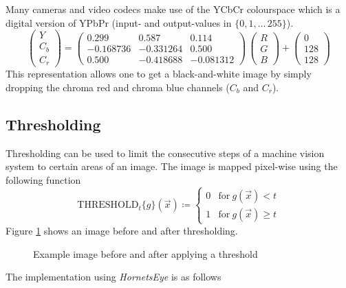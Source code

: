 \documentclass[a4paper,12pt]{book}
\begin{document}
Many cameras and video codecs make use of the YCbCr colourspace which
is a digital version of YPbPr (input- and output-values in
$\{0,1,\ldots\,255\}$)\cite{fourcc}.
\begin{equation*}
  \begin{pmatrix}Y\\C_b\\C_r\end{pmatrix}=
  \begin{pmatrix}0.299&0.587&0.114\\
    -0.168736&-0.331264&0.500\\
    0.500&-0.418688&-0.081312
  \end{pmatrix}\,
  \begin{pmatrix}R\\G\\B\end{pmatrix}+
  \begin{pmatrix}0\\128\\128\end{pmatrix}
\end{equation*}
This representation allows one to get a black-and-white image by simply
dropping the chroma red and chroma blue channels ($C_b$ and $C_r$).

\subsection{Thresholding}
Thresholding can be used to limit the
consecutive steps of a machine vision system to certain areas of an image.
The image is mapped pixel-wise using the following function
\begin{equation*}
  \mathrm{THRESHOLD}_t\{g\}(\vec{x})\coloneqq\left\{\begin{array}{ll}
      0 & \mathrm{for\ }g(\vec{x})<t\\
      1 & \mathrm{for\ }g(\vec{x})\ge t
    \end{array}\right.
\end{equation*}
Figure \ref{fig:binarise} shows an image before and after thresholding.
\begin{figure}[htbp]
   \begin{center}
     \begin{minipage}[c]{.45\textwidth}
     \end{minipage}
     \begin{minipage}[c]{.45\textwidth}
     \end{minipage}
     \caption{Example image before and after applying a threshold\label{fig:binarise}}
   \end{center}
\end{figure}
The implementation using \emph{HornetsEye} is as follows
\begin{scriptsize}
  
\end{scriptsize}
\end{document}
